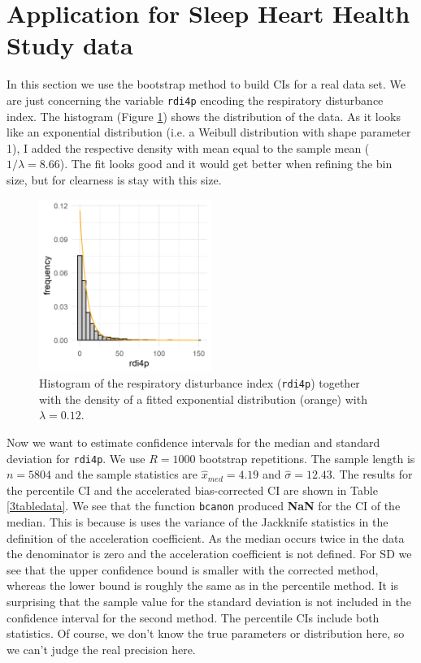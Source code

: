 \section{Application for Sleep Heart Health Study data}
In this section we use the bootstrap method to build CIs for a real data set. We are just concerning the variable \texttt{rdi4p} encoding the respiratory disturbance index. The histogram (Figure \ref{3histdata}) shows the distribution of the data. As it looks like an exponential distribution (i.e. a Weibull distribution with shape parameter 1), I added the respective density with mean equal to the sample mean ($1/\lambda = 8.66$). The fit looks good and it would get better when refining the bin size, but for clearness is stay with this size.
\begin{figure}[!b]
\centering
\includegraphics[width=0.5\textwidth, keepaspectratio]{ex3/hist_data.png}
\caption{Histogram of the respiratory disturbance index (\texttt{rdi4p}) together with the density of a fitted exponential distribution (orange) with $\lambda = 0.12$.}
\label{3histdata}
\end{figure}

Now we want to estimate confidence intervals for the median and standard deviation for \texttt{rdi4p}. We use $R=1000$ bootstrap repetitions. The sample length is $n=5804$ and the sample statistics are $\hat{x}_{med}=4.19$ and $\hat{\sigma}=12.43$. The results for the percentile CI and the accelerated bias-corrected CI are shown in Table \ref{3tabledata}. We see that the function \texttt{bcanon} produced \textbf{NaN} for the CI of the median. This is because is uses the variance of the Jackknife statistics in the definition of the acceleration coefficient. As the median occurs twice in the data the denominator is zero and the acceleration coefficient is not defined. For SD we see that the upper confidence bound is smaller with the corrected method, whereas the lower bound is roughly the same as in the percentile method. It is surprising that the sample value for the standard deviation is not included in the confidence interval for the second method. The percentile CIs include both statistics. Of course, we don't know the true parameters or distribution here, so we can't judge the real precision here.  

